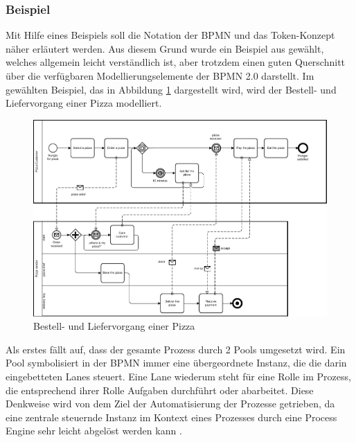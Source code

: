 \documentclass[a4paper,12pt]{report}
\begin{document}
\subsubsection{Beispiel}\label{subsubsec:BPMNBeispiel}
Mit Hilfe eines Beispiels soll die Notation der BPMN und das Token-Konzept näher erläutert werden. Aus diesem Grund wurde ein Beispiel aus \citep{OMG2010} gewählt, welches allgemein leicht verständlich ist, aber trotzdem einen guten Querschnitt über die verfügbaren Modellierungselemente der BPMN 2.0 darstellt. Im gewählten Beispiel, das in Abbildung \ref{bpmn_pizza_collaboration} dargestellt wird, wird der Bestell- und Liefervorgang einer Pizza modelliert.
\begin{figure}[ht]
\centering
\includegraphics[width=1\textwidth]{Images/pizza_collaboration}
\caption[Bestell- und Liefervorgang einer Pizza]{Bestell- und Liefervorgang einer Pizza \citep[S. 4]{OMG2010}}
\label{bpmn_pizza_collaboration}
\end{figure}

Als erstes fällt auf, dass der gesamte Prozess durch 2 Pools umgesetzt wird. Ein Pool symbolisiert in der BPMN immer eine übergeordnete Instanz, die die darin eingebetteten Lanes steuert. Eine Lane wiederum steht für eine Rolle im Prozess, die entsprechend ihrer Rolle Aufgaben durchführt oder abarbeitet. Diese Denkweise wird von dem Ziel der Automatisierung der Prozesse getrieben, da eine zentrale steuernde Instanz im Kontext eines Prozesses durch eine Process Engine sehr leicht abgelöst werden kann \citep[vgl.][S. 96ff.]{Freund2014}.
\end{document}
